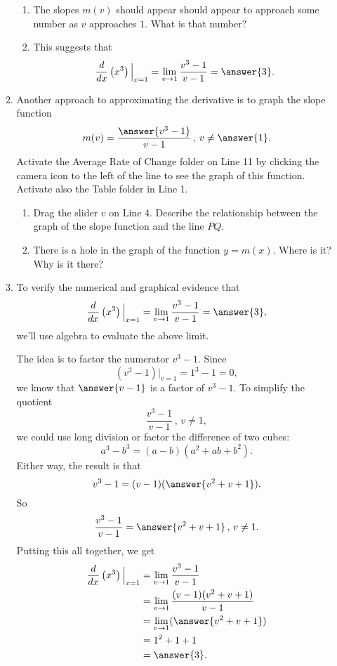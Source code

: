 \documentclass{ximera}
\begin{document}
\begin{exploration}
\begin{enumerate}
\begin{enumerate}
\begin{enumerate}
\item The slopes $m(v)$ should appear should appear to approach some number as $v$ approaches $1$. What is that number?

\item This suggests that 
\[
   \frac{d}{dx}\left( x^3 \right)\Big|_{x=1}  = \lim_{v\to 1} \frac{v^3-1}{v-1} = \answer{3} .
\] 
\end{enumerate}

\item Another approach to approximating the derivative is to graph the slope function
\[
    m(v) = \frac{\answer{v^3-1}}{v-1} \, , \, v\neq \answer{1}.
\]
Activate the Average Rate of Change folder on Line 11 by clicking the camera icon to the left of the line to see the graph of this function. Activate also the Table folder in Line 1.

\begin{enumerate}
\item Drag the slider $v$ on Line 4. Describe the relationship between the graph of the slope function and the line $PQ$. %

\item There is a hole in the graph of the function $y=m(x)$. Where is it? Why is it there?

\end{enumerate}

\item To verify the numerical and graphical evidence that %
\[
     \frac{d}{dx}\left( x^3 \right)\Big|_{x=1}  = \lim_{v\to 1} \frac{v^3-1}{v-1}  =\answer{3} ,
\]
we'll use algebra to evaluate the above limit. 

The idea is to factor the numerator $v^3-1$. Since 
\[
     (v^3 - 1)\Big|_{v=1} = 1^3 - 1 = 0 ,
\]
we know that $\answer{v-1}$ is a factor of $v^3-1$. To simplify the quotient
\[
  \frac{v^3-1}{v-1} \, , \, v\neq 1,
\]
we could use long division or factor the difference of two cubes:
\[
   a^3 - b^3 = (a-b)(a^2 + ab + b^2).
\]
Either way, the result is that
\[
     v^3 - 1 = (v-1)(\answer{v^2 + v + 1}).
\]
So
\[
   \frac{v^3-1}{v-1} = \answer{v^2+v+1} \, , \, v\neq 1.
\]
Putting this all together, we get
\begin{align*}
\frac{d}{dx}\left( x^3 \right)\Big|_{x=1}  & = \lim_{v\to 1} \frac{v^3-1}{v-1} \\
                                                              &= \lim_{v\to 1} \frac{(v-1)(v^2+v+1)}{v-1} \\
                                                             & = \lim_{v\to 1}(\answer{v^2 + v + 1}) \\
                                                            & = 1^2 + 1 + 1 \\
                                                            & = \answer{3} .
\end{align*}
\end{enumerate}

\end{enumerate}
\end{exploration}
\end{document}
